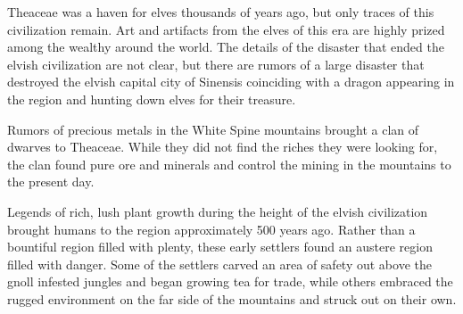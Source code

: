 Theaceae was a haven for elves thousands of years ago, but only traces of this civilization remain.
Art and artifacts from the elves of this era are highly prized among the wealthy around the world.
The details of the disaster that ended the elvish civilization are not clear, but there are rumors of a large disaster that destroyed the elvish capital city of Sinensis coinciding with a dragon appearing in the region and hunting down elves for their treasure.

Rumors of precious metals in the White Spine mountains brought a clan of dwarves to Theaceae.
While they did not find the riches they were looking for, the clan found pure ore and minerals and control the mining in the mountains to the present day.

Legends of rich, lush plant growth during the height of the elvish civilization brought humans to the region approximately 500 years ago.
Rather than a bountiful region filled with plenty, these early settlers found an austere region filled with danger.
Some of the settlers carved an area of safety out above the gnoll infested jungles and began growing tea for trade, while others embraced the rugged environment on the far side of the mountains and struck out on their own.
